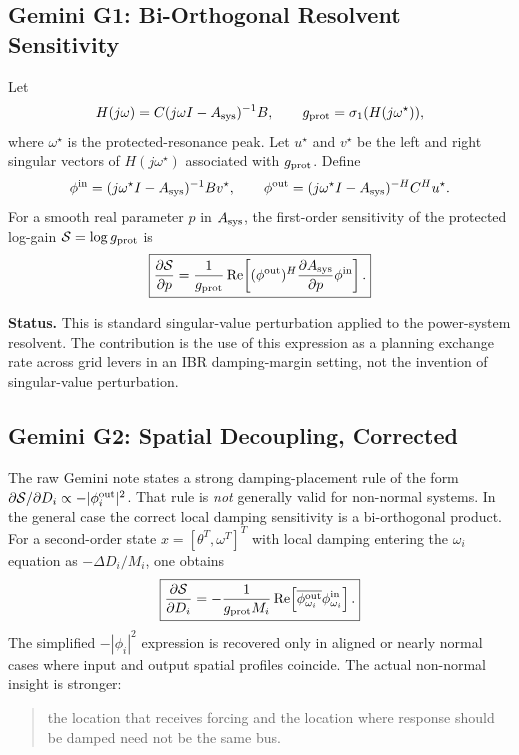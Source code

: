 \documentclass[11pt]{article}
\begin{document}
\subsection{Gemini G1: Bi-Orthogonal Resolvent Sensitivity}

Let
\[
    H(j\omega)=C(j\omega I-A_{\rm sys})^{-1}B,
    \qquad
    g_{\rm prot}=\sigma_1(H(j\omega^\star)),
\]
where $\omega^\star$ is the protected-resonance peak.  Let $u^\star$ and
$v^\star$ be the left and right singular vectors of $H(j\omega^\star)$ associated
with $g_{\rm prot}$.  Define
\[
    \phi^{\rm in}=(j\omega^\star I-A_{\rm sys})^{-1}Bv^\star ,
    \qquad
    \phi^{\rm out}=(j\omega^\star I-A_{\rm sys})^{-H}C^H u^\star .
\]
For a smooth real parameter $p$ in $A_{\rm sys}$, the first-order sensitivity of
the protected log-gain $\mathcal S=\log g_{\rm prot}$ is
\[
    \boxed{
    \frac{\partial \mathcal S}{\partial p}
    =
    \frac{1}{g_{\rm prot}}
    \operatorname{Re}\!\left[
      (\phi^{\rm out})^H
      \frac{\partial A_{\rm sys}}{\partial p}
      \phi^{\rm in}
    \right].}
\]

\textbf{Status.} This is standard singular-value perturbation applied to the
power-system resolvent.  The contribution is the use of this expression as a
planning exchange rate across grid levers in an IBR damping-margin setting, not
the invention of singular-value perturbation.

\subsection{Gemini G2: Spatial Decoupling, Corrected}

The raw Gemini note states a strong damping-placement rule of the form
$\partial \mathcal S/\partial D_i\propto-|\phi^{\rm out}_i|^2$.  That rule is
\emph{not} generally valid for non-normal systems.  In the general case the
correct local damping sensitivity is a bi-orthogonal product.  For a second-order
state $x=[\theta^T,\omega^T]^T$ with local damping entering the $\omega_i$
equation as $-\Delta D_i/M_i$, one obtains
\[
    \boxed{
    \frac{\partial \mathcal S}{\partial D_i}
    =
    -\frac{1}{g_{\rm prot}M_i}
    \operatorname{Re}\!\left[
      \overline{\phi^{\rm out}_{\omega_i}}
      \phi^{\rm in}_{\omega_i}
    \right].}
\]
The simplified $-|\phi_i|^2$ expression is recovered only in aligned or nearly
normal cases where input and output spatial profiles coincide.  The actual
non-normal insight is stronger:
\begin{quote}
the location that receives forcing and the location where response should be
damped need not be the same bus.
\end{quote}
\end{document}
